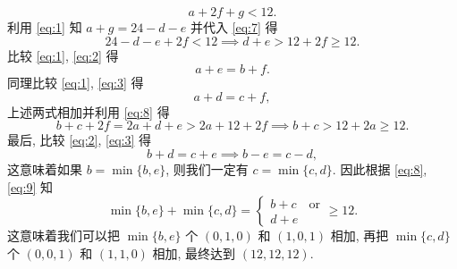 \begin{soln}
\begin{description}
\begin{equation}
\label{eq:7}
a + 2f + g < 12.
\end{equation}
利用 \cref{eq:1} 知 $a + g = 24 - d - e$ 并代入 \cref{eq:7} 得
\begin{equation}
\label{eq:8}
24 - d - e + 2f < 12 \implies d + e > 12 + 2f \ge 12.
\end{equation}
比较 \cref{eq:1}, \cref{eq:2} 得
\[
a + e = b + f.
\]
同理比较 \cref{eq:1}, \cref{eq:3} 得
\[
a + d = c + f,
\]
上述两式相加并利用 \cref{eq:8} 得
\begin{equation}
\label{eq:9}
b + c + 2f = 2a + d + e > 2a + 12 + 2f \implies
b + c > 12 + 2a \ge 12.
\end{equation}
最后, 比较 \cref{eq:2}, \cref{eq:3} 得
\begin{equation}
\label{eq:10}
b + d = c + e \implies b - e = c - d,
\end{equation}
这意味着如果 $b = \min\{b,e\}$, 则我们一定有 $c = \min\{c,d\}$.
因此根据 \cref{eq:8}, \cref{eq:9} 知
\[
\min\{b,e\} + \min\{c,d\} = \begin{cases}
b + c \quad \text{or}\\
d + e
\end{cases} \ge 12.
\]
这意味着我们可以把 $\min\{b,e\}$ 个 $(0,1,0)$ 和 $(1,0,1)$ 相加,
再把 $\min\{c,d\}$ 个 $(0,0,1)$ 和 $(1,1,0)$ 相加,
最终达到 $(12,12,12)$.
\end{description}
\end{soln}
